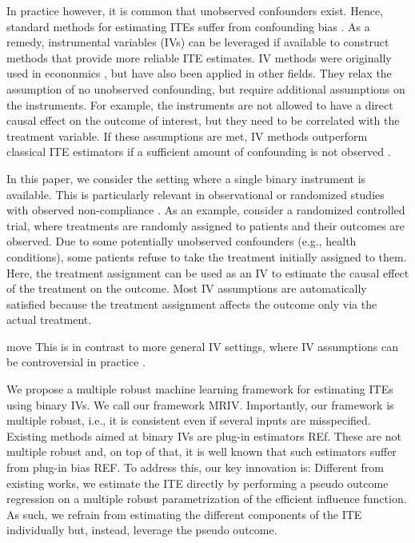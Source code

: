 \documentclass[nonatbib]{article}
\newcommand{\TODO}[1]{{\color{red}#1}}
\newcommand{\frameworkname}{MRIV\xspace}
\theoremstyle{definition}
\theoremstyle{plain}
\begin{document}

In practice however, it is common that unobserved confounders exist. Hence, standard methods for estimating ITEs suffer from confounding bias \cite{Pearl.2009}. As a remedy, instrumental variables (IVs) can be leveraged if available to construct methods that provide more reliable ITE estimates. IV methods were originally used in econonmics \cite{Wright.1928}, but have also been applied in other fields. They relax the assumption of no unobserved confounding, but require additional assumptions on the instruments. For example, the instruments are not allowed to have a direct causal effect on the outcome of interest, but they need to be correlated with the treatment variable. If these assumptions are met, IV methods outperform classical ITE estimators if a sufficient amount of confounding is not observed \cite{Hartford.2017}.


In this paper, we consider the setting where a single binary instrument is available. This is particularly relevant in observational or randomized studies with observed non-compliance \cite{Imbens.1994}. As an example, consider a randomized controlled trial, where treatments are randomly assigned to patients and their outcomes are observed. Due to some potentially unobserved confounders (e.g., health conditions), some patients refuse to take the treatment initially assigned to them. Here, the treatment assignment can be used as an IV to estimate the causal effect of the treatment on the outcome. Most IV assumptions are automatically satisfied because the treatment assignment affects the outcome only via the actual treatment. 

\TODO{move} This is in contrast to more general IV settings, where IV assumptions can be controversial in practice \cite{Wooldridge.2013}.


We propose a multiple robust machine learning framework for estimating ITEs using binary IVs. We call our framework \frameworkname. Importantly, our framework is multiple robust, i.e., it is consistent even if several inputs are misspecified. Existing methods aimed at binary IVs are plug-in estimators \TODO{REf}. These are not multiple robust and, on top of that, it is well known that such estimators suffer from plug-in bias \TODO{REF}. To address this, our key innovation is: Different from existing works, we estimate the ITE directly by performing a pseudo outcome regression on a multiple robust parametrization of the efficient influence function. As such, we refrain from estimating the different components of the ITE individually but, instead, leverage the pseudo outcome. 
\end{document}
